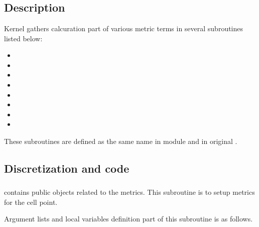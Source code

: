 \section{}
\label{dyn_metrics}

\subsection{Description}

Kernel  gathers calcuration part of various metric
terms in several subroutines listed below:
\begin{itemize}
 \item {}
 \item {}
 \item {}
 \item {}
 \item {}
 \item {}
 \item {}
 \item {}
\end{itemize}
%
These subroutines are defined as the same name in module 
and  in original \NICAM.

\subsection{Discretization and code}



\subsubsection{}

 contains public objects related to the metrics.
%
This subroutine is to setup metrics for the cell point.

Argument lists and local variables definition part of this subroutine is
as follows.

